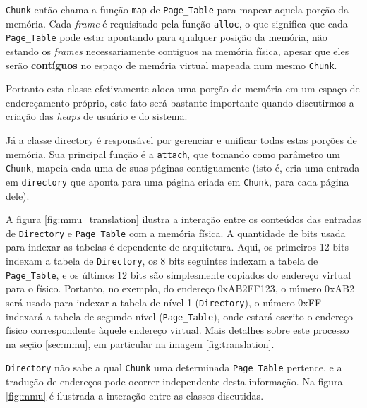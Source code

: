 \verb+Chunk+ então chama a função \verb+map+ de \verb+Page_Table+ para mapear aquela porção da memória. Cada \emph{frame} é requisitado pela função \verb+alloc+, o que significa que cada \verb+Page_Table+ pode estar apontando para qualquer posição da memória, não estando os \emph{frames} necessariamente contiguos na memória física, apesar que eles serão \textbf{contíguos} no espaço de memória virtual mapeada num mesmo \verb+Chunk+.

Portanto esta classe efetivamente aloca uma porção de memória em um espaço de endereçamento próprio, este fato será bastante importante quando discutirmos a criação das \emph{heaps} de usuário e do sistema.


Já a classe directory é responsável por gerenciar e unificar todas estas porções de memória. Sua principal função é a \verb+attach+, que tomando como parâmetro um \verb+Chunk+, mapeia cada uma de suas páginas contiguamente (isto é, cria uma entrada em \verb=directory= que aponta para uma página criada em \verb+Chunk+, para cada página dele).

A figura \ref{fig:mmu_translation} ilustra a interação entre os conteúdos das entradas de \verb+Directory+ e \verb+Page_Table+ com a memória física. A quantidade de bits usada para indexar as tabelas é dependente de arquitetura. Aqui, os primeiros 12 bits indexam a tabela de \verb+Directory+, os 8 bits seguintes indexam a tabela de \verb+Page_Table+, e os últimos 12 bits são simplesmente copiados do endereço virtual para o físico.
Portanto, no exemplo, do endereço 0xAB2FF123, o número 0xAB2 será usado para indexar a tabela de nível 1 (\verb=Directory=), o número 0xFF indexará a tabela de segundo nível (\verb+Page_Table+), onde estará escrito o endereço físico correspondente àquele endereço virtual.
Mais detalhes sobre este processo na seção \ref{sec:mmu}, em particular na imagem \ref{fig:translation}.




\verb+Directory+ não sabe a qual \verb+Chunk+ uma determinada \verb+Page_Table+ pertence, e a tradução de endereços pode ocorrer independente desta informação. Na figura \ref{fig:mmu} é ilustrada a interação entre as classes discutidas.

